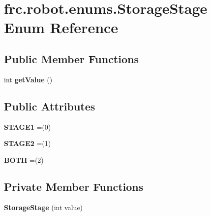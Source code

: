 \hypertarget{enumfrc_1_1robot_1_1enums_1_1_storage_stage}{}\section{frc.\+robot.\+enums.\+Storage\+Stage Enum Reference}
\label{enumfrc_1_1robot_1_1enums_1_1_storage_stage}
\subsection*{Public Member Functions}
\begin{DoxyCompactItemize}
\item 
\mbox{\label{enumfrc_1_1robot_1_1enums_1_1_storage_stage_ab40acec2c6da80ef62bd7cc89bd81048}} 
int {\bfseries get\+Value} ()
\end{DoxyCompactItemize}
\subsection*{Public Attributes}
\begin{DoxyCompactItemize}
\item 
\mbox{\label{enumfrc_1_1robot_1_1enums_1_1_storage_stage_a1ac4f8d110fe1751f09ca7ae4c0aa9df}} 
{\bfseries S\+T\+A\+G\+E1} =(0)
\item 
\mbox{\label{enumfrc_1_1robot_1_1enums_1_1_storage_stage_aab6a8b7a091afe032ad73cf4151730d5}} 
{\bfseries S\+T\+A\+G\+E2} =(1)
\item 
\mbox{\label{enumfrc_1_1robot_1_1enums_1_1_storage_stage_a2b0e34c429934ce27704c351bd32a9ad}} 
{\bfseries B\+O\+TH} =(2)
\end{DoxyCompactItemize}
\subsection*{Private Member Functions}
\begin{DoxyCompactItemize}
\item 
\mbox{\label{enumfrc_1_1robot_1_1enums_1_1_storage_stage_ab396ed8bb9fa8edd1a0cfcb519ec922a}} 
{\bfseries Storage\+Stage} (int value)
\end{DoxyCompactItemize}
